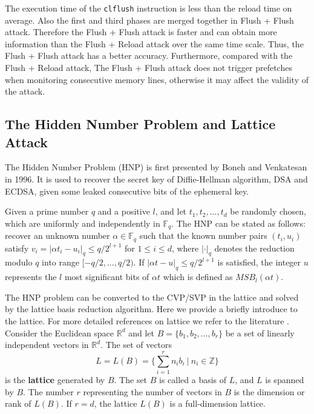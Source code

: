 The execution time of the \verb+clflush+ instruction is less than the reload time on average.
    Also the first and third phases are merged together in Flush + Flush attack.
  Therefore the Flush + Flush attack is faster and can obtain more information than the Flush + Reload attack over the same time scale.
Thus, the Flush + Flush attack has a better accuracy.
Furthermore, compared with the Flush + Reload attack,
The Flush + Flush attack does not trigger prefetches when monitoring consecutive memory lines, otherwise it may affect the validity of the attack.




\subsection{The Hidden Number Problem and Lattice Attack}
\label{intro_hnp}
The Hidden Number Problem (HNP) is first presented by Boneh and Venkatesan \cite{boneh1996} in 1996.
It is used to recover the secret key of Diffie-Hellman algorithm, DSA and ECDSA, given some leaked consecutive bits of the ephemeral key.

Given a prime number $q$ and a positive $l$,
 and let $t_1, t_2, ..., t_d$ be randomly chosen, which are uniformly and independently in $\mathbb{F}_q$.
The HNP can be stated as follows:
  recover an unknown number $\alpha \in \mathbb{F}_q$ such that the known number pairs $(t_i, u_i)$ satisfy $v_i = |\alpha t_i - u_i|_{q} \leq q/2^{l+1}$ for $1 \leq i \leq d$,
   where $|\cdot|_q$ denotes the reduction modulo $q$ into range $[-q/2, ..., q/2)$.
If $|\alpha t - u|_{q} \leq q/2^{l+1}$ is satisfied,
the integer $u$ represents the $l$ most significant bits of $\alpha t$ which is defined as ${MSB}_l(\alpha t)$.


The HNP problem can be converted to the CVP/SVP in the lattice and solved by the lattice basis reduction algorithm.
Here we provide a briefly introduce to the lattice.
For more detailed references on lattice we refer to the literature \cite{latticereduction2000}.
Consider the Euclidean space $\mathbb{R}^{d}$
 and let $B = \{b_1, b_2, ..., b_r\}$ be a set of linearly independent vectors in $\mathbb{R}^d$.
The set of vectors
$$
L = L(B) = \{\sum_{i=1}^{r}{n_ib_i} \  |\ n_i \in \mathbb{Z} \}
$$
is the \textbf{lattice} generated by $B$.
The set $B$ is called a basis of $L$, and $L$ is spanned by $B$.
The number $r$ representing the number of vectors in $B$ is the dimension or rank of $L(B)$.
If $r = d$, the lattice $L(B)$ is a full-dimension lattice.

